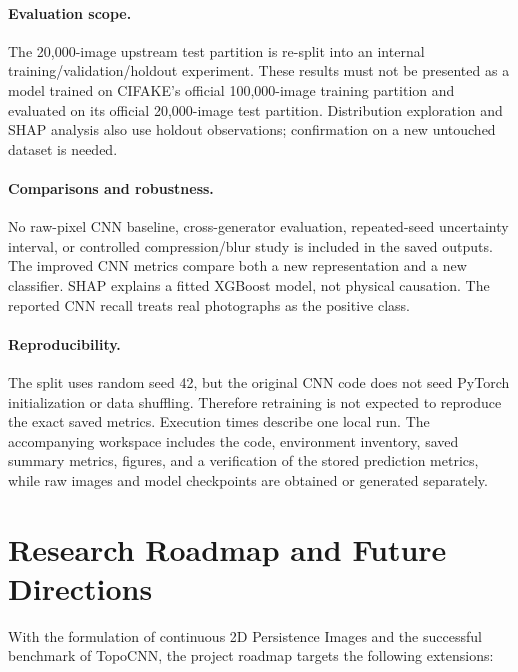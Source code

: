 \documentclass[11pt,a4paper]{article}
\begin{document}
\paragraph{Evaluation scope.} The 20,000-image upstream test partition is re-split into an internal training/validation/holdout experiment. These results must not be presented as a model trained on CIFAKE's official 100,000-image training partition and evaluated on its official 20,000-image test partition. Distribution exploration and SHAP analysis also use holdout observations; confirmation on a new untouched dataset is needed.

\paragraph{Comparisons and robustness.} No raw-pixel CNN baseline, cross-generator evaluation, repeated-seed uncertainty interval, or controlled compression/blur study is included in the saved outputs. The improved CNN metrics compare both a new representation and a new classifier. SHAP explains a fitted XGBoost model, not physical causation. The reported CNN recall treats real photographs as the positive class.

\paragraph{Reproducibility.} The split uses random seed 42, but the original CNN code does not seed PyTorch initialization or data shuffling. Therefore retraining is not expected to reproduce the exact saved metrics. Execution times describe one local run. The accompanying workspace includes the code, environment inventory, saved summary metrics, figures, and a verification of the stored prediction metrics, while raw images and model checkpoints are obtained or generated separately.

\section{Research Roadmap and Future Directions}

With the formulation of continuous 2D Persistence Images and the successful benchmark of TopoCNN, the project roadmap targets the following extensions:
\end{document}
